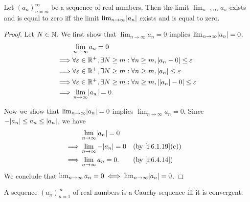 \begin{cor}\label{i:6.4.17}
  Let \((a_n)_{n = m}^\infty\) be a sequence of real numbers.
  Then the limit \(\lim_{n \to \infty} a_n\) exists and is equal to zero iff the limit \(\lim_{n \to \infty} \abs{a_n}\) exists and is equal to zero.
\end{cor}

\begin{proof}
  Let \(N \in \mathbb{N}\).
  We first show that \(\lim_{n \to \infty} a_n = 0\) implies \(\lim_{n \to \infty} \abs{a_n} = 0\).
  \begin{align*}
             & \lim_{n \to \infty} a_n = 0                                                                             \\
    \implies & \forall \varepsilon \in \R^+, \exists N \geq m : \forall n \geq m, \abs{a_n - 0} \leq \varepsilon       \\
    \implies & \forall \varepsilon \in \R^+, \exists N \geq m : \forall n \geq m, \abs{a_n} \leq \varepsilon           \\
    \implies & \forall \varepsilon \in \R^+, \exists N \geq m : \forall n \geq m, \abs{\abs{a_n} - 0} \leq \varepsilon \\
    \implies & \lim_{n \to \infty} \abs{a_n} = 0.
  \end{align*}

  Now we show that \(\lim_{n \to \infty} \abs{a_n} = 0\) implies \(\lim_{n \to \infty} a_n = 0\).
  Since \(-\abs{a_n} \leq a_n \leq \abs{a_n}\), we have
  \begin{align*}
             & \lim_{n \to \infty} \abs{a_n} = 0                        \\
    \implies & \lim_{n \to \infty} -\abs{a_n} = 0 &  & \by{i:6.1.19}[c] \\
    \implies & \lim_{n \to \infty} a_n = 0.       &  & \by{i:6.4.14}
  \end{align*}
  We conclude that \(\lim_{n \to \infty} a_n = 0 \iff \lim_{n \to \infty} \abs{a_n} = 0\).
\end{proof}

\begin{thm}\label{i:6.4.18}
  A sequence \((a_n)_{n = 1}^\infty\) of real numbers is a Cauchy sequence iff it is convergent.
\end{thm}

